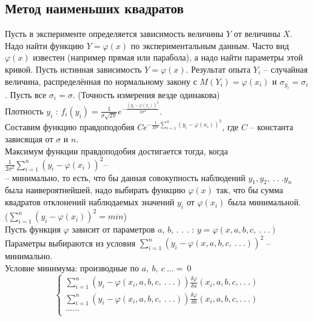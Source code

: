\documentclass[russian, 12pt, fleqn]{article}
\begin{document}
\subsection{Метод наименьших квадратов}
\noindent
Пусть в эксперименте определяется зависимость величины $Y$ от величины $X$. Надо найти функцию $Y=\varphi(x)$ по экспериментальным данным. Часто вид $\varphi(x)$ известен (например прямая или парабола), а надо найти параметры этой кривой. Пусть истинная зависимость $Y = \varphi(x)$. Результат опыта $Y_i$ -- случайная величина, распределённая по нормальному закону с $M(Y_i)=\varphi(x_i)$ и $\sigma_{y_i} = \sigma_i$. Пусть все $\sigma_i = \sigma$. (Точность измерения везде одинакова)\\
Плотность $y_i$ : $f_i(y_i) = \frac{1}{\sigma \sqrt{2\pi}} e^{-\frac{(y_i - \varphi(x_i))^2}{2\sigma^2}}$.\\
Составим функцию правдоподобия  $Ce^{-\frac{1}{2\sigma^2}\displaystyle{\sum \limits_{i = 1}^{n}} (y_i - \varphi(x_i))^2}$, где $C$ -- константа зависящая от $\sigma$ и $n$.\\
Максимум функции правдоподобия достигается тогда, когда $\frac{1}{2\sigma^2}\displaystyle{\sum \limits_{i = 1}^{n}} (y_i-\varphi(x_i))^2$--\\-- минимально, то есть, что бы данная совокупность наблюдений $y_1, y_2,\ .\ .\ .y_n$ была наивероятнейшей, надо выбирать функцию $\varphi(x)$ так, что бы сумма квадратов отклонений наблюдаемых значений $y_i$ от $\varphi(x_i)$ была минимальной.\\
 ($\displaystyle{\sum \limits_{i = 1}^{n}} (y_i - \varphi(x_i))^2 = min$)\\
Пусть функция $\varphi$ зависит от параметров $a$, $b$, . . . : $y = \varphi(x, a, b, c, \ .\ .\ .)$\\
Параметры выбираются из условия $\displaystyle{\sum \limits_{i = 1}^{n}} (y_i - \varphi(x, a, b, c, \ .\ .\ .))^2$ -- минимально.\\
Условие минимума: производные по $a,\ b,\ c\ ...=\ 0$
\\
\noindent
\begin{equation*} 
 \begin{cases}
   \displaystyle{\sum \limits_{i = 1}^{n}} (y_i -  \varphi(x_i, a, b, c,\ .\ .\ .))\frac{\delta \varphi}{\delta a}(x_i, a, b, c, .\ .\ . ) \\
   \displaystyle{\sum \limits_{i = 1}^{n}} (y_i -  \varphi(x_i, a, b, c,\ .\ .\ .))\frac{\delta \varphi}{\delta b}(x_i, a, b, c, .\ .\ . ) \\
   ......\\
 \end{cases}
\end{equation*}
\end{document}
